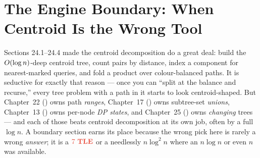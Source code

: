 \section{The Engine Boundary: When Centroid Is the Wrong Tool}\label{sec:c18-boundary}

\begin{previouslybox}
Sections 24.1--24.4 made the centroid decomposition do a great deal: build the
\(O(\log n)\)-deep centroid tree, count pairs by distance, index a component for
nearest-marked queries, and fold a product over colour-balanced paths. It is seductive
for exactly that reason --- once you can ``split at the balance and recurse,'' every
tree problem with a path in it starts to look centroid-shaped. But Chapter~22 ()
owns path \emph{ranges}, Chapter~17 () owns subtree-set \emph{unions},
Chapter~13 () owns per-node \emph{DP states}, and Chapter~25 ()
owns \emph{changing} trees --- and each of those beats centroid decomposition at its own
job, often by a full \(\log n\). A boundary section earns its place because the wrong
pick here is rarely a wrong \emph{answer}; it is a \(\tle\) or a needlessly \(n\log^2 n\)
where an \(n\log n\) or even \(n\) was available.
\end{previouslybox}

